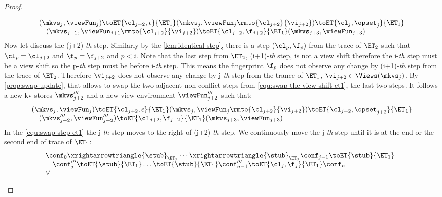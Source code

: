 \begin{proof}
\begin{itemize}
\begin{itemize}
\begin{equation}
\begin{array}{@{}l@{}}
    (\mkvs_{j}, \viewFun_{j}) \toET{\cl_{j+2}, \epsilon}{\ET_1} (\mkvs_{j}, \viewFun_{j}\rmto{\cl_{j+2}}{\vi_{j+2}}) \toET{\cl_{j}, \opset_{j}}{\ET_1} \\
    \quad (\mkvs_{j + 1}, \viewFun_{j + 1}\rmto{\cl_{j+2}}{\vi_{j+2}}) \toET{\cl_{j+2}, \f_{j+2}}{\ET_1} (\mkvs_{j+3}, \viewFun_{j+3})
    \end{array}
\end{equation}
Now let discuss the (j+2)-\emph{th} step.
Similarly by the \cref{lem:identical-step}, there is a step \((\cl_p, \f_p)\) from the trace of \( \ET_2 \) such that \( \cl_p = \cl_{j+2}\) and \( \f_p = \f_{j+2}\) and \( p < i \).
Note that the last step from \( \ET_2 \), \ie (i+1)-\emph{th} step, is not a view shift therefore the i-\emph{th} step must be a view shift so the p-\emph{th} step must be before  i-\emph{th} step.
This means the fingerprint \( \f_p \) does not observe any change by (i+1)-\emph{th} step from the trace of \( \ET_2 \).
Therefore \( \vi_{j+2} \) does not observe any change by j-\emph{th} step from the trance of \( \ET_1\), \ie \( \vi_{j+2} \in \Views(\mkvs_j) \).
By \cref{prop:swap-update}, that allows to swap the two adjacent non-conflict steps from \cref{equ:swap-the-view-shift-et1}, \ie the last two steps.
It follows a new kv-stores \( \mkvs'''_{j+2}\) and a new view environment \( \viewFun'''_{j+2} \) such that:
\begin{equation}
    \label{equ:swap-step-et1}
    \begin{array}{@{}l@{}}
    (\mkvs_{j}, \viewFun_{j}) \toET{\cl_{j+2}, \epsilon}{\ET_1} (\mkvs_{j}, \viewFun_{j}\rmto{\cl_{j+2}}{\vi_{j+2}}) \toET{\cl_{j+2}, \opset_{j+2}}{\ET_1} \\
    \quad (\mkvs_{j + 2}''', \viewFun_{j + 2}''') \toET{\cl_{j+2}, \f_{j+2}}{\ET_1} (\mkvs_{j+3}, \viewFun_{j+3})
    \end{array}
\end{equation}
In the \cref{equ:swap-step-et1} the j-\emph{th} step moves to the right of (j+2)-\emph{th} step.
We continuously move the j-\emph{th} step until it is at the end or the second end of trace of \( \ET_1 \):
\[
    \begin{array}{@{}l}
        \conf_0 \xrightarrowtriangle{\stub}_{\ET_{1}} \cdots \xrightarrowtriangle{\stub}_{\ET_{1}} \conf_{j-1} \toET{\stub}{\ET_{1}} \\ 
        \quad \conf'''_{j} \toET{\stub}{\ET_{1}} \dots \toET{\stub}{\ET_{1}} \conf'''_{n-1} \toET{\cl_j, \f_j }{\ET_{1}} \conf_{n}  \\
        {} \lor 

\end{array}\]
\end{itemize}
\end{itemize}
\end{proof}
